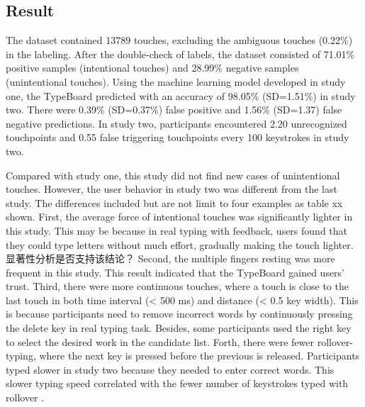 \subsection{Result}


The dataset contained 13789 touches, excluding the ambiguous touches (0.22\%) in the labeling. After the double-check of labels, the dataset consisted of 71.01\% positive samples (intentional touches) and 28.99\% negative samples (unintentional touches). Using the machine learning model developed in study one, the TypeBoard predicted with an accuracy of 98.05\% (SD=1.51\%) in study two. There were 0.39\% (SD=0.37\%) false positive and 1.56\% (SD=1.37) false negative predictions. In study two, participants encountered 2.20 unrecognized touchpoints and 0.55 false triggering touchpoints every 100 keystrokes in study two.


Compared with study one, this study did not find new cases of unintentional touches. However, the user behavior in study two was different from the last study. The differences included but are not limit to four examples as table xx shown. First, the average force of intentional touches was significantly lighter in this study. This may be because in real typing with feedback, users found that they could type letters without much effort, gradually making the touch lighter. 显著性分析是否支持该结论？ Second, the multiple fingers resting was more frequent in this study. This result indicated that the TypeBoard gained users' trust. Third, there were more continuous touches, where a touch is close to the last touch in both time interval (< 500 ms) and distance (< 0.5 key width). This is because participants need to remove incorrect words by continuously pressing the delete key in real typing task. Besides, some participants used the right key to select the desired work in the candidate list. Forth, there were fewer rollover-typing, where the next key is pressed before the previous is released. Participants typed slower in study two because they needed to enter correct words. This slower typing speed correlated with the fewer number of keystrokes typed with rollover \cite{2018-Observations}.

